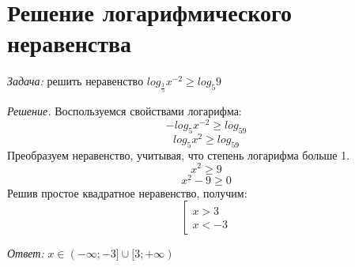 \documentclass[12pt]{article}
\begin{document}
\section{Решение логарифмического неравенства}
\textit{Задача:} решить неравенство $log_{\frac{1}{5}}x^{-2} \geq log_{5}9$

    \textit{Решение.} Воспользуемся свойствами логарифма:
    \[ -log_5x^{-2} \geq log_59 \]
    \[ log_5x^2 \geq log_59 \]
    Преобразуем неравенство, учитывая, что степень логарифма больше 1.
    \[ x^2 \geq 9\]
    \[ x^2 - 9 \geq 0\]
    Решив простое квадратное неравенство, получим:
    \[ 
    \left[
    \begin{array}{l}
    x>3\\
    x<-3
    \end{array}
    \right.
    \]
        
        \textit{Ответ:} $x\in (-\infty; -3] \cup [3; +\infty)$
\end{document}
